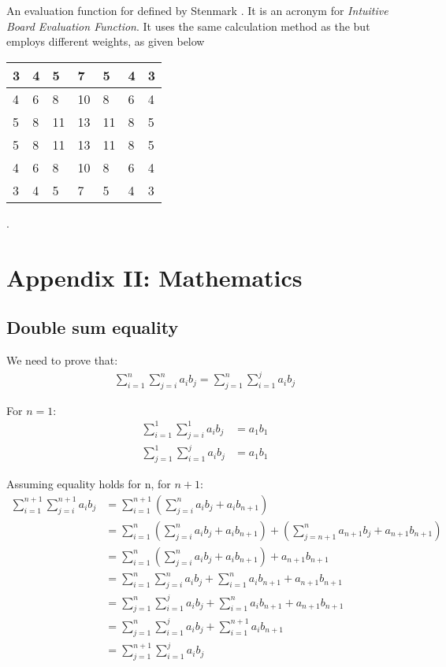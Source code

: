  {An evaluation function for   defined by Stenmark \cite{stenmark:masters}.  It is an acronym for  {\it Intuitive Board Evaluation Function}.  It uses the same calculation method as the  but employs different weights, as given below 
\newline
\begin{center}
\begin{tabular} {|l|l|l|l|l|l|l|}
	\hline
	3&4& 5& 7& 5&4&3 \\ \hline
	4&6& 8&10& 8&6&4 \\ \hline
	5&8&11&13&11&8&5 \\ \hline
	5&8&11&13&11&8&5 \\ \hline
	4&6& 8&10& 8&6&4 \\ \hline
	3&4& 5& 7& 5&4&3 \\ \hline
\end{tabular}
\end{center}
}. 

\chapter*{Appendix II: Mathematics}
\section{Double sum equality}
\label{sec:sum_proof}
We need to prove that:
\begin{align}
\sum_{i=1}^n\sum_{j=i}^n a_ib_j = \sum_{j=1}^n\sum_{i=1}^j a_ib_j
\end{align}

For $n = 1$:
\begin{align}
\sum_{i=1}^1\sum_{j=i}^1 a_ib_j &= a_1b_1 \\
\sum_{j=1}^1\sum_{i=1}^j a_ib_j &= a_1b_1 
\end{align}

Assuming equality holds for n, for $n+1$:
\begin{align}
\sum_{i=1}^{n+1}\sum_{j=i}^{n+1} a_ib_j 
&= \sum_{i=1}^{n+1}\left(\sum_{j=i}^{n} a_ib_j + a_ib_{n+1}\right) \\
&= \sum_{i=1}^{n}\left(\sum_{j=i}^{n} a_ib_j + a_ib_{n+1}\right) 
+ \left(\sum_{j=n+1}^{n} a_{n+1}b_j + a_{n+1}b_{n+1}\right) \\
&= \sum_{i=1}^{n}\left(\sum_{j=i}^{n} a_ib_j + a_ib_{n+1}\right) 
+ a_{n+1}b_{n+1} \\
&= \sum_{i=1}^{n}\sum_{j=i}^{n} a_ib_j + \sum_{i=1}^{n} a_ib_{n+1}
+ a_{n+1}b_{n+1} \\
&= \sum_{j=1}^n\sum_{i=1}^j a_ib_j + \sum_{i=1}^{n} a_ib_{n+1}
+ a_{n+1}b_{n+1} \\
&= \sum_{j=1}^n\sum_{i=1}^j a_ib_j + \sum_{i=1}^{n+1} a_ib_{n+1} \\
&= \sum_{j=1}^{n+1}\sum_{i=1}^j a_ib_j 
\end{align}